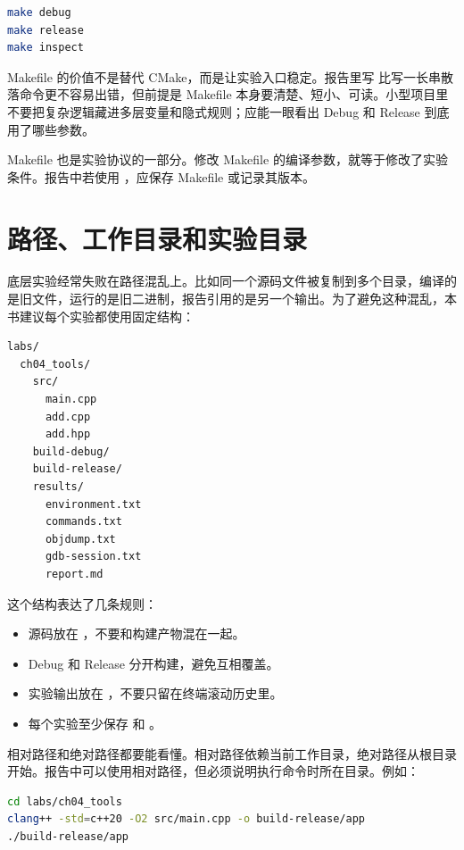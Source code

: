 \begin{lstlisting}[language=bash]
make debug
make release
make inspect
\end{lstlisting}

Makefile 的价值不是替代 CMake，而是让实验入口稳定。报告里写  比写一长串散落命令更不容易出错，但前提是 Makefile 本身要清楚、短小、可读。小型项目里不要把复杂逻辑藏进多层变量和隐式规则；应能一眼看出 Debug 和 Release 到底用了哪些参数。

\begin{warningbox}
Makefile 也是实验协议的一部分。修改 Makefile 的编译参数，就等于修改了实验条件。报告中若使用 ，应保存 Makefile 或记录其版本。
\end{warningbox}

\section{路径、工作目录和实验目录}

底层实验经常失败在路径混乱上。比如同一个源码文件被复制到多个目录，编译的是旧文件，运行的是旧二进制，报告引用的是另一个输出。为了避免这种混乱，本书建议每个实验都使用固定结构：

\begin{lstlisting}
labs/
  ch04_tools/
    src/
      main.cpp
      add.cpp
      add.hpp
    build-debug/
    build-release/
    results/
      environment.txt
      commands.txt
      objdump.txt
      gdb-session.txt
      report.md
\end{lstlisting}

这个结构表达了几条规则：

\begin{itemize}
  \item 源码放在 ，不要和构建产物混在一起。
  \item Debug 和 Release 分开构建，避免互相覆盖。
  \item 实验输出放在 ，不要只留在终端滚动历史里。
  \item 每个实验至少保存  和 。
\end{itemize}

相对路径和绝对路径都要能看懂。相对路径依赖当前工作目录，绝对路径从根目录开始。报告中可以使用相对路径，但必须说明执行命令时所在目录。例如：

\begin{lstlisting}[language=bash]
cd labs/ch04_tools
clang++ -std=c++20 -O2 src/main.cpp -o build-release/app
./build-release/app
\end{lstlisting}

